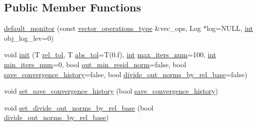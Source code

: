 \subsection*{Public Member Functions}
\begin{DoxyCompactItemize}
\item 
\hyperlink{classnumerical__algos_1_1lin__solvers_1_1default__monitor_adff676b99030bc92c310106c5c9acadb}{default\-\_\-monitor} (const \hyperlink{classnumerical__algos_1_1lin__solvers_1_1default__monitor_a1353cb66ac3391ffaba236b3a860dc8e}{vector\-\_\-operations\-\_\-type} \&vec\-\_\-ops, Log $\ast$log=N\-U\-L\-L, \hyperlink{classint}{int} obj\-\_\-log\-\_\-lev=0)
\item 
void \hyperlink{classnumerical__algos_1_1lin__solvers_1_1default__monitor_a63f9d87378092ebb0877c099166b9c64}{init} (T \hyperlink{classnumerical__algos_1_1lin__solvers_1_1default__monitor_ada85d0e3f07a8a4ef176a8c6ca090329}{rel\-\_\-tol}, T \hyperlink{classnumerical__algos_1_1lin__solvers_1_1default__monitor_a28c4268cf6cc7058a351083a6b6272d1}{abs\-\_\-tol}=T(0.f), \hyperlink{classint}{int} \hyperlink{classnumerical__algos_1_1lin__solvers_1_1default__monitor_afcb878caf8bc1c3f816896df59689c78}{max\-\_\-iters\-\_\-num}=100, \hyperlink{classint}{int} \hyperlink{classnumerical__algos_1_1lin__solvers_1_1default__monitor_a4cbfc2ff13dde5cff2d65267bb86398f}{min\-\_\-iters\-\_\-num}=0, bool \hyperlink{classnumerical__algos_1_1lin__solvers_1_1default__monitor_a91011d0a20628ed3488009180dadd15c}{out\-\_\-min\-\_\-resid\-\_\-norm}=false, bool \hyperlink{classnumerical__algos_1_1lin__solvers_1_1default__monitor_a397c2b87b68d1f24c24645c06b2550c8}{save\-\_\-convergence\-\_\-history}=false, bool \hyperlink{classnumerical__algos_1_1lin__solvers_1_1default__monitor_a23c2f5d0d37b20c027dc6890ae649c2e}{divide\-\_\-out\-\_\-norms\-\_\-by\-\_\-rel\-\_\-base}=false)
\item 
void \hyperlink{classnumerical__algos_1_1lin__solvers_1_1default__monitor_a394d0837e6ac1e01413f5026646b3d7e}{set\-\_\-save\-\_\-convergence\-\_\-history} (bool \hyperlink{classnumerical__algos_1_1lin__solvers_1_1default__monitor_a397c2b87b68d1f24c24645c06b2550c8}{save\-\_\-convergence\-\_\-history})
\item 
void \hyperlink{classnumerical__algos_1_1lin__solvers_1_1default__monitor_af9ef0caa9961a54a7f12a6f9947faaf9}{set\-\_\-divide\-\_\-out\-\_\-norms\-\_\-by\-\_\-rel\-\_\-base} (bool \hyperlink{classnumerical__algos_1_1lin__solvers_1_1default__monitor_a23c2f5d0d37b20c027dc6890ae649c2e}{divide\-\_\-out\-\_\-norms\-\_\-by\-\_\-rel\-\_\-base})

\end{DoxyCompactItemize}
